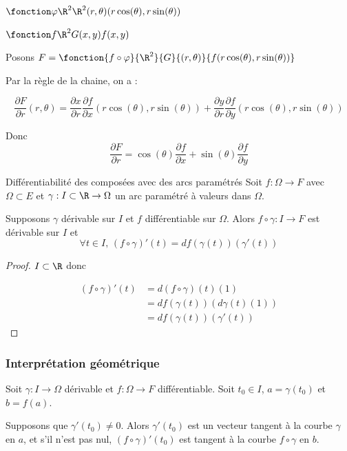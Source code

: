 \begin{exemple}
    $\fonction \varphi {\R^2}{\R^2}{(r, \theta)}{(r \cos(\theta), r \sin(\theta))}$

    $\fonction f {\R^2}{G}{(x, y)}{f(x, y)}$

    Posons $F = \fonction{f \circ \varphi}{\R^2}{G}{(r, \theta)}{f(r \cos(\theta), r \sin(\theta))}$

    Par la règle de la chaine, on a : 

    $$\frac{\partial F}{\partial r } (r, \theta) = \frac{\partial x}{\partial r } \frac{\partial f }{\partial x } (r \cos(\theta), r \sin(\theta)) + \frac{\partial y }{\partial r } \frac{\partial f }{\partial y } (r \cos(\theta), r \sin(\theta))$$

    Donc 
    $$\frac{\partial F}{\partial r } = \cos(\theta) \frac{\partial f }{\partial x }  + \sin(\theta) \frac{\partial f }{\partial y } $$
\end{exemple}

\begin{proposition}{Différentiabilité des composées avec des arcs paramétrés}{}
    Soit $f : \Omega \to F$ avec $\Omega \subset E$ et 
    $\gamma : I  \subset \R \to \Omega$ un arc paramétré à valeurs dans $\Omega$.

    Supposons $\gamma$ dérivable sur $I$ et $f$ différentiable sur $\Omega$. Alors 
    $f \circ \gamma : I \to F$ est dérivable sur $I$ et 
    $$\forall t \in I, \, (f \circ \gamma)'(t) = df(\gamma(t))(\gamma'(t))$$
\end{proposition}

\begin{proof}
    $I \subset \R$ donc 

    \begin{align}
        (f \circ \gamma)'(t) & = d(f \circ \gamma)(t)(1) \\
        & = df(\gamma(t))(d\gamma(t)(1)) \\
        & = df(\gamma(t))(\gamma'(t))
    \end{align}
\end{proof}

\subsubsection{Interprétation géométrique}

Soit $\gamma : I \to \Omega$ dérivable et 
$f : \Omega \to F$ différentiable. Soit $t_0 \in I$, $a = \gamma(t_0)$ et 
$b = f(a)$.

Supposons que $\gamma'(t_0) \neq 0$. Alors $\gamma'(t_0)$ est un vecteur tangent à la 
courbe $\gamma$ en $a$, et s'il n'est pas nul, 
$(f \circ \gamma)'(t_0)$ est tangent à la courbe $f \circ \gamma$ en $b$.


